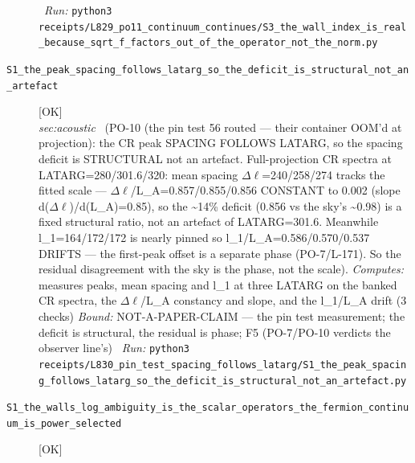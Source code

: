 \begin{description}
\ \emph{Run:} \texttt{python3 receipts/L829\_po11\_continuum\_continues/S3\_the\_wall\_index\_is\_real\_because\_sqrt\_f\_factors\_out\_of\_the\_operator\_not\_the\_norm.py}
\item[\label{rcpt:S1_the_peak_spacing_follows_latarg_so_the_deficit_is_structural_not_an_artefact}\texttt{S1\_the\_peak\_spacing\_follows\_latarg\_so\_the\_deficit\_is\_structural\_not\_an\_artefact}]\hfill\textsf{[OK]}\\
\textit{sec:acoustic} \ (PO-10 (the pin test 56 routed --- their container OOM'd at projection): the CR peak SPACING FOLLOWS LATARG, so the spacing deficit is STRUCTURAL not an artefact. Full-projection CR spectra at LATARG=280/301.6/320: mean spacing \ensuremath{\Delta}\ensuremath{\ell}=240/258/274 tracks the fitted scale --- \ensuremath{\Delta}\ensuremath{\ell}/L\_A=0.857/0.855/0.856 CONSTANT to 0.002 (slope d(\ensuremath{\Delta}\ensuremath{\ell})/d(L\_A)=0.85), so the \textasciitilde{}14\% deficit (0.856 vs the sky's \textasciitilde{}0.98) is a fixed structural ratio, not an artefact of LATARG=301.6. Meanwhile l\_1=164/172/172 is nearly pinned so l\_1/L\_A=0.586/0.570/0.537 DRIFTS --- the first-peak offset is a separate phase (PO-7/L-171). So the residual disagreement with the sky is the phase, not the scale). 
\emph{Computes:} measures peaks, mean spacing and l\_1 at three LATARG on the banked CR spectra, the \ensuremath{\Delta}\ensuremath{\ell}/L\_A constancy and slope, and the l\_1/L\_A drift (3 checks)
 \emph{Bound:} NOT-A-PAPER-CLAIM --- the pin test measurement; the deficit is structural, the residual is phase; F5 (PO-7/PO-10 verdicts the observer line's)
\ \emph{Run:} \texttt{python3 receipts/L830\_pin\_test\_spacing\_follows\_latarg/S1\_the\_peak\_spacing\_follows\_latarg\_so\_the\_deficit\_is\_structural\_not\_an\_artefact.py}
\item[\label{rcpt:S1_the_walls_log_ambiguity_is_the_scalar_operators_the_fermion_continuum_is_power_selected}\texttt{S1\_the\_walls\_log\_ambiguity\_is\_the\_scalar\_operators\_the\_fermion\_continuum\_is\_power\_selected}]\hfill\textsf{[OK]}\\

\end{description}
